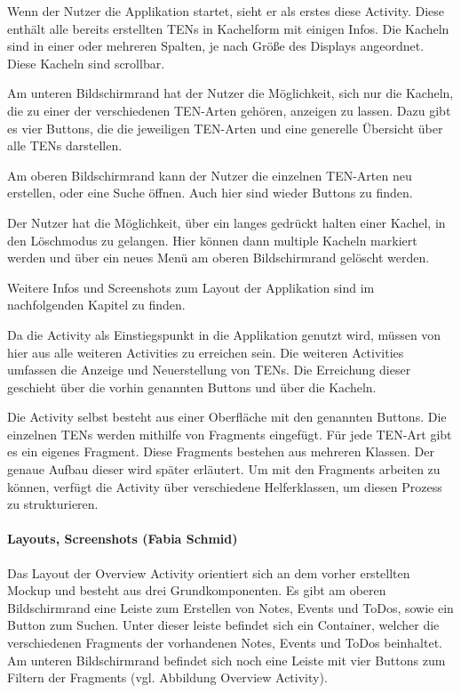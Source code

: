 Wenn der Nutzer die Applikation startet, sieht er als erstes diese Activity. Diese enthält alle bereits erstellten TENs in Kachelform mit einigen Infos. Die Kacheln sind in einer oder mehreren Spalten, je nach Größe des Displays angeordnet. Diese Kacheln sind scrollbar.

Am unteren Bildschirmrand hat der Nutzer die Möglichkeit, sich nur die Kacheln, die zu einer der verschiedenen TEN-Arten gehören, anzeigen zu lassen. Dazu gibt es vier Buttons, die die jeweiligen TEN-Arten und eine generelle Übersicht über alle TENs darstellen.

Am oberen Bildschirmrand kann der Nutzer die einzelnen TEN-Arten neu erstellen, oder eine Suche öffnen. Auch hier sind wieder Buttons zu finden.

Der Nutzer hat die Möglichkeit, über ein langes gedrückt halten einer Kachel, in den Löschmodus zu gelangen. Hier können dann multiple Kacheln markiert werden und über ein neues Menü am oberen Bildschirmrand gelöscht werden.

Weitere Infos und Screenshots zum Layout der Applikation sind im nachfolgenden Kapitel zu finden.

Da die Activity als Einstiegspunkt in die Applikation genutzt wird, müssen von hier aus alle weiteren Activities zu erreichen sein. Die weiteren Activities umfassen die Anzeige und Neuerstellung von TENs. Die Erreichung dieser geschieht über die vorhin genannten Buttons und über die Kacheln.

Die Activity selbst besteht aus einer Oberfläche mit den genannten Buttons. Die einzelnen TENs werden mithilfe von Fragments eingefügt. Für jede TEN-Art gibt es ein eigenes Fragment. Diese Fragments bestehen aus mehreren Klassen. Der genaue Aufbau dieser wird später erläutert. Um mit den Fragments arbeiten zu können, verfügt die Activity über verschiedene Helferklassen, um diesen Prozess zu strukturieren.


\paragraph{Layouts, Screenshots (Fabia Schmid)}
Das Layout der Overview Activity orientiert sich an dem vorher erstellten Mockup und besteht aus drei Grundkomponenten. Es gibt am oberen Bildschirmrand eine Leiste zum Erstellen von Notes, Events und ToDos, sowie ein Button zum Suchen. Unter dieser leiste befindet sich ein Container, welcher die verschiedenen Fragments der vorhandenen Notes, Events und ToDos beinhaltet. Am unteren Bildschirmrand befindet sich noch eine Leiste mit vier Buttons zum Filtern der  Fragments (vgl. Abbildung Overview Activity).

